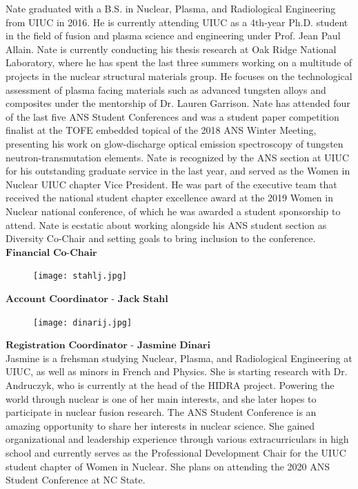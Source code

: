 Nate graduated with a B.S. in Nuclear, Plasma, and Radiological Engineering from UIUC in 2016. He is currently attending UIUC as a 4th-year Ph.D. student in the field of fusion and plasma science and engineering under Prof. Jean Paul Allain. Nate is currently conducting his thesis research at Oak Ridge National Laboratory, where he has spent the last three summers working on a multitude of projects in the nuclear structural materials group. He focuses on the technological assessment of plasma facing materials such as advanced tungsten alloys and composites under the mentorship of Dr. Lauren Garrison. Nate has attended four of the last five ANS Student Conferences and was a student paper competition finalist at the TOFE embedded topical of the 2018 ANS Winter Meeting, presenting his work on glow-discharge optical emission spectroscopy of tungsten neutron-transmutation elements. Nate is recognized by the ANS section at UIUC for his outstanding graduate service in the last year, and served as the Women in Nuclear UIUC chapter Vice President. He was part of the executive team that received the national student chapter excellence award at the 2019 Women in Nuclear national conference, of which he was awarded a student sponsorship to attend. Nate is ecstatic about working alongside his ANS student section as Diversity Co-Chair and setting goals to bring inclusion to the conference.\\

$\textbf{Financial Co-Chair}$\\
\setlength\intextsep{0pt}
\begin{figure}
	\begin{center}
		\vspace{-\baselineskip}
		\texttt{[image: stahlj.jpg]}
	\end{center}
\end{figure}
$\textbf{Account Coordinator - Jack Stahl}$\\
\lipsum[1-1]

\setlength\intextsep{0pt}
\begin{figure}
	\begin{center}
		\vspace{-\baselineskip}
		\texttt{[image: dinarij.jpg]}
	\end{center}
\end{figure}
$\textbf{Registration Coordinator - Jasmine Dinari}$\\
Jasmine is a frehsman studying Nuclear, Plasma, and Radiological Engineering at UIUC, as well as minors in French and Physics. She is starting research with Dr. Andruczyk, who is currently at the head of the HIDRA project. Powering the world through nuclear is one of her main interests, and she later hopes to participate in nuclear fusion research. The ANS Student Conference is an  amazing opportunity to share her interests in nuclear science. She gained organizational and leadership experience through various extracurriculars in high school and currently serves as the Professional Development Chair for the UIUC student chapter of Women in Nuclear. She plans on attending the 2020 ANS Student Conference at NC State.



